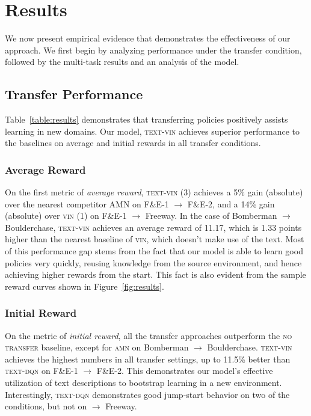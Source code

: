 \section{Results}
\label{sec:results}
We now present empirical evidence that demonstrates the effectiveness of our approach. We first begin by analyzing performance under the transfer condition, followed by the multi-task results and an analysis of the model.

\subsection{Transfer Performance}
Table~\ref{table:results} demonstrates that transferring policies positively assists learning in new domains. Our model, \textsc{text-vin} achieves superior performance to the baselines on average and initial rewards in all transfer conditions.

\subsubsection{Average Reward}
On the first metric of \emph{average reward}, \textsc{text-vin (3)} achieves a 5\% gain (absolute) over the nearest competitor AMN on F\&E-1 $\to$ F\&E-2, and a 14\% gain (absolute) over \textsc{vin (1)} on F\&E-1 $\to$ Freeway. In the case of Bomberman $\to$ Boulderchase, \textsc{text-vin} achieves an average reward of 11.17, which is 1.33 points higher than the nearest baseline of \textsc{vin}, which doesn't make use of the text. Most of this performance gap stems from the fact that our model is able to learn good policies very quickly, reusing knowledge from the source environment, and hence achieving higher rewards from the start. This fact is also evident from the sample reward curves shown in Figure~\ref{fig:results}.

\subsubsection{Initial Reward}
On the metric of \emph{initial reward}, all the transfer approaches outperform the \textsc{no transfer} baseline, except for \textsc{amn} on Bomberman $\to$ Boulderchase. \textsc{text-vin} achieves the highest numbers in all transfer settings, up to 11.5\% better than \textsc{text-dqn} on F\&E-1 $\to$ F\&E-2. This demonstrates our model's effective utilization of text descriptions to bootstrap learning in a new environment. Interestingly, \textsc{text-dqn} demonstrates good jump-start behavior on two of the conditions, but not on  $\to$ Freeway. 

